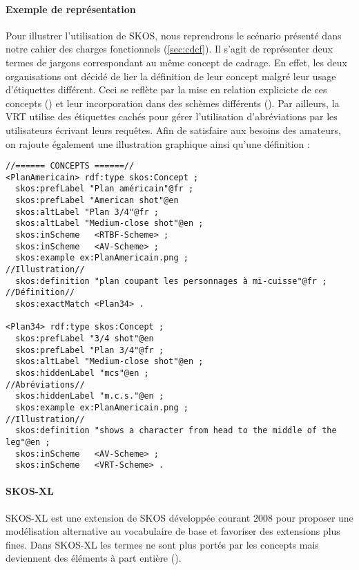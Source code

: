 \paragraph{Exemple de représentation} 
Pour illustrer l'utilisation de SKOS, nous reprendrons le scénario présenté dans notre cahier des charges fonctionnels (\ref{sec:cdcf}). 
Il s'agit de représenter deux termes de jargons correspondant au même concept de cadrage.
En effet, les deux organisations ont décidé de lier la définition de leur concept malgré leur usage d'étiquettes différent. 
Ceci se reflète par la mise en relation explicicte de ces concepts () et leur incorporation dans des schèmes différents ().
Par ailleurs, la VRT utilise des étiquettes cachés pour gérer l'utilisation d'abréviations par les utilisateurs écrivant leurs requêtes. 
Afin de satisfaire aux besoins des amateurs, on rajoute également une illustration graphique ainsi qu'une définition :
\begin{Verbatim}[fontsize=\small,formatcom=\color{black!70}]
//====== CONCEPTS ======//
<PlanAmericain> rdf:type skos:Concept ; 
  skos:prefLabel "Plan américain"@fr ;
  skos:prefLabel "American shot"@en
  skos:altLabel "Plan 3/4"@fr ;
  skos:altLabel "Medium-close shot"@en ;
  skos:inScheme   <RTBF-Scheme> ;
  skos:inScheme   <AV-Scheme> ;
  skos:example ex:PlanAmericain.png ;                               //Illustration//
  skos:definition "plan coupant les personnages à mi-cuisse"@fr ;   //Définition//
  skos:exactMatch <Plan34> .
   
<Plan34> rdf:type skos:Concept ;
  skos:prefLabel "3/4 shot"@en
  skos:prefLabel "Plan 3/4"@fr ;
  skos:altLabel "Medium-close shot"@en ;
  skos:hiddenLabel "mcs"@en ;                                           //Abréviations//
  skos:hiddenLabel "m.c.s."@en ;
  skos:example ex:PlanAmericain.png ;                                   //Illustration//
  skos:definition "shows a character from head to the middle of the leg"@en ;
  skos:inScheme   <AV-Scheme> ;
  skos:inScheme   <VRT-Scheme> .
\end{Verbatim}



\paragraph{SKOS-XL}\label{sec:skos-xl}
SKOS-XL est une extension de SKOS développée courant 2008 pour proposer une modélisation alternative au vocabulaire de base et favoriser des extensions plus fines. 
Dans SKOS-XL les termes ne sont plus portés par les concepts mais deviennent des éléments à part entière (). 

